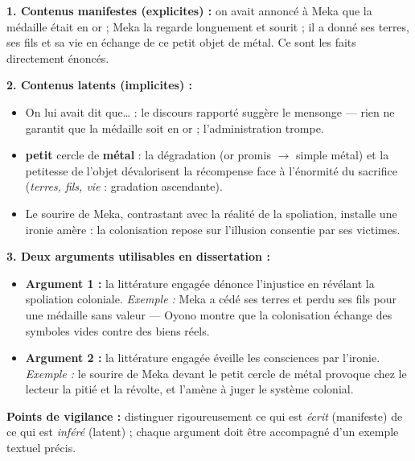\documentclass[11pt]{article}
\newcommand{\cle}[1]{{\popxbold\color{popdark}#1}}
\begin{document}
\begin{corrige}
\textbf{1. Contenus manifestes (explicites) :} on avait annoncé à Meka que la médaille était en or ; Meka la regarde longuement et sourit ; il a donné ses terres, ses fils et sa vie en échange de ce petit objet de métal. Ce sont les faits directement énoncés.

\textbf{2. Contenus latents (implicites) :}
\begin{itemize}
\item \og On lui avait dit que\ldots \fg{} : le discours rapporté suggère le \cle{mensonge} — rien ne garantit que la médaille soit en or ; l'administration trompe.
\item \og \textbf{petit} cercle de \textbf{métal} \fg{} : la dégradation (or promis $\rightarrow$ simple métal) et la petitesse de l'objet dévalorisent la récompense face à l'énormité du sacrifice (\emph{terres, fils, vie} : gradation ascendante).
\item Le sourire de Meka, contrastant avec la réalité de la spoliation, installe une \cle{ironie amère} : la colonisation repose sur l'illusion consentie par ses victimes.
\end{itemize}

\textbf{3. Deux arguments utilisables en dissertation :}
\begin{itemize}
\item \textbf{Argument 1 :} la littérature engagée dénonce l'injustice en révélant la spoliation coloniale. \emph{Exemple :} Meka a cédé ses terres et perdu ses fils pour une médaille sans valeur — Oyono montre que la colonisation échange des symboles vides contre des biens réels.
\item \textbf{Argument 2 :} la littérature engagée éveille les consciences par l'ironie. \emph{Exemple :} le sourire de Meka devant le \og petit cercle de métal \fg{} provoque chez le lecteur la pitié et la révolte, et l'amène à juger le système colonial.
\end{itemize}
\textbf{Points de vigilance :} distinguer rigoureusement ce qui est \emph{écrit} (manifeste) de ce qui est \emph{inféré} (latent) ; chaque argument doit être accompagné d'un exemple textuel précis.
\end{corrige}
\end{document}
